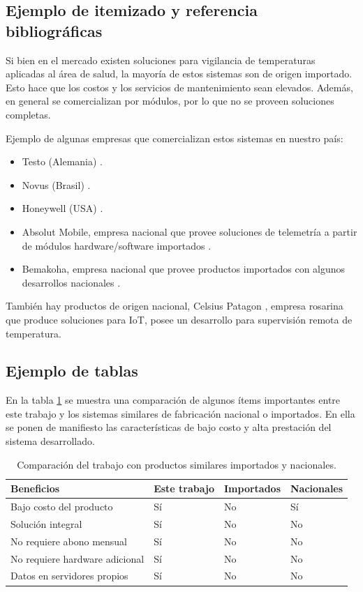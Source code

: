 \subsection{Ejemplo de itemizado y referencia bibliográficas}
Si bien en el mercado existen soluciones para vigilancia de temperaturas aplicadas al área de salud, la mayoría de estos sistemas son de origen importado. Esto hace que los costos y los servicios de mantenimiento sean elevados. Además, en general se comercializan por módulos, por lo que no se proveen soluciones completas.

Ejemplo de algunas empresas que comercializan estos sistemas en nuestro país: 
\begin{itemize}
\item Testo (Alemania) \citep{testo}. 
\item Novus (Brasil) \citep{novus}. 
\item Honeywell (USA) \citep{honeywell}.  
\item Absolut Mobile, empresa nacional que provee soluciones de telemetría a partir de módulos hardware/software importados \citep{absolutmobile}.
\item Bemakoha, empresa nacional que provee productos importados con algunos desarrollos nacionales \citep{bemakoha}.
\end{itemize}

También hay productos de origen nacional, Celsius Patagon \citep{celsius}, empresa rosarina que produce soluciones para IoT, posee un desarrollo para supervisión remota de temperatura. 
 

\subsection{Ejemplo de tablas}

En la tabla \ref{tab:comparacionsistemas} se muestra una comparación de algunos ítems importantes entre este trabajo y los sistemas similares de fabricación nacional o importados. En ella se ponen de manifiesto las características de bajo costo y alta prestación del sistema desarrollado.

\vspace{1cm}
\begin{table}[h]
	\centering
	\caption[Comparación del trabajo con productos similares importados y nacionales.]{Comparación del trabajo con productos similares importados y nacionales.}
	\begin{tabular}{l l l l}    
	\toprule
	\textbf{Beneficios}    & \textbf{Este trabajo} & \textbf{Importados}& \textbf{Nacionales}\\
	\midrule
Bajo costo del producto & Sí&No &Sí\\
Solución integral& Sí&No &No\\	
No requiere abono mensual & Sí&No &No\\	
No requiere hardware adicional& Sí&No &No\\	
Datos en servidores propios& Sí&No &No\\	
		\bottomrule
		\hline
	\end{tabular}
	\label{tab:comparacionsistemas}
\end{table}


